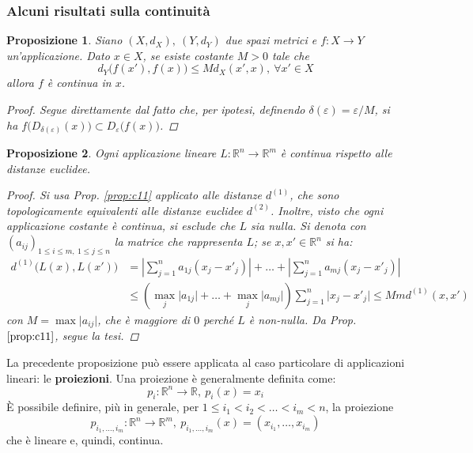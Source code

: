 \documentclass[11pt, a4paper]{scrartcl}
\theoremstyle{style1}
\newtheorem{prop}{Proposizione}[section]
\numberwithin{equation}{subsection}
\begin{document}
\subsubsection{Alcuni risultati sulla continuit\`a}
\begin{prop}
Siano $(X,d_X), \ (Y,d_Y)$ due spazi metrici e $f:X\to Y$ un'applicazione. Dato $x \in X$, se esiste costante $M>0$ tale che
\[
d_Y\big(f(x'), f(x)\big) \le Md_X(x',x), \ \forall x ' \in X
\] 
allora $f$ \`e continua in $x$.
\begin{proof}
	Segue direttamente dal fatto che, per ipotesi, definendo $\delta (\varepsilon ) = \varepsilon / M$, si ha $f\big(D_{\delta (\varepsilon )} (x)\big) \subset D_\varepsilon \big(f(x)\big)$.
\end{proof}
\end{prop}
\begin{prop}
	Ogni applicazione lineare $L : \mathbb{R}^n \to \mathbb{R}^m$ \`e continua rispetto alle distanze euclidee.
	\begin{proof}
		Si usa Prop. \ref{prop:c11} applicato alle distanze $d^{(1)} $, che sono topologicamente equivalenti alle distanze euclidee $d^{(2)} $. Inoltre, visto che ogni applicazione costante \`e continua, si esclude che $L$ sia nulla. Si denota con $(a_{ij} )_{1\le i\le m, \ 1\le j\le n} $ la matrice che rappresenta $L$; se $x, x' \in \mathbb{R}^n$ si ha:
		\[
			\begin{split}
				d^{(1)} \big(L(x) , L(x')\big)&= \left\lvert \sum_{j=1}^{n} a_{1j} (x_j-x'_j) \right\rvert + \ldots+ \left\lvert  \sum_{j=1}^{n} a_{mj} (x_j - x'_j) \right\rvert \\
						       &\le \left(\max_j \lvert a_{1j} \rvert+ \ldots +\max_j \lvert a_{mj}  \rvert   \right) \sum_{j=1}^{n} \lvert x_j - x'_j \rvert \le  Mm d^{(1)} (x,x')
			\end{split}
		\] 
		con $M=\max \lvert a_{ij}  \rvert$, che \`e maggiore di $0$ perch\'e $L$ \`e non-nulla. Da Prop. $\ref{prop:c11}$, segue la tesi.
	\end{proof}
\end{prop}
\noindent La precedente proposizione pu\`o essere applicata al caso particolare di applicazioni lineari: le \textbf{proiezioni}. Una proiezione \`e generalmente definita come:
\begin{equation}
	p_i:\mathbb{R}^n \to \mathbb{R}, \ p_i(x) = x_i
\end{equation}
\`E possibile definire, pi\`u in generale, per $1\le i_1 < i_2< \ldots<i_m <n$, la proiezione
\begin{equation}
	p_{i_1,\ldots,i_m}:\mathbb{R}^n \to \mathbb{R}^m, \  p_{i_1,\ldots,i_m} (x) = (x_{i_1} ,\ldots,x_{i_m} )
\end{equation}
che \`e lineare e, quindi, continua.
\end{document}
